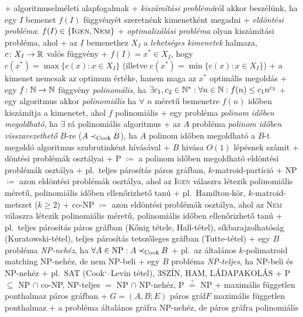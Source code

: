 + algoritmuselméleti alapfogalmak
  + \dfn \emph{kiszámítási problémá}ról akkor beszélünk, ha egy $I$
    bemenet $f(I)$ függvényét szeretnénk kimenetként megadni
    + \emph{eldöntési probléma}: $f(I) \in \{\textsc{Igen},
      \textsc{Nem}\}$
  + \dfn \emph{optimalizálási probléma} olyan kiszámítási probléma, ahol
    + az $I$ bemenethez $X_I$ a \emph{lehetséges kimenetek} halmaza,
      $c\colon X_I \to \mathbb{R}$ valós függvény
    + $f(I) = x^* \in X_I$, hogy $c(x^*) = \max \{ c(x) : x \in X_I \}$
      (illetve $c(x^*) = \min \{ c(x) : x \in X_I \}$)
    + a kimenet nemcsak az optimum értéke, hanem maga az $x^*$ optimális
      megoldás
  + \dfn egy $f \colon \mathbb{N} \to \mathbb{N}$ függvény \emph{polinomális}, ha
    $\exists c_1, c_2 \in \mathbb{N}^*: \forall n \in \mathbb{N} : f(n) \le c_1
    n^{c_2}$
    + egy algoritmus akkor \emph{polinomiális} ha $\forall$ $n$ méretű
      bemenetre $f(n)$ időben kiszámítja a kimenetet, ahol $f$
      polinomiális
    + egy probléma \emph{polinom időben megoldható}, ha $\exists$ rá
      polinomiális algoritmus
  + \dfn az $A$ probléma \emph{polinom időben visszavezethető} $B$-re
    ($A \mathbin{{\prec}_{\textrm{Cook}}} B$), ha $A$ polinom időben megoldható a
    $B$-t megoldó algoritmus szubrutinként hívásával
    + $B$ hivása $O(1)$ lépésnek számit
  + \dfn döntési problémák osztályai
    + P $\coloneqq$ a polinom időben megoldható eldöntési
      problémák osztálya
      + pl.~teljes párosítás páros gráfban, $k$-matroid-partíció
    + NP $\coloneqq$ azon eldöntési problémák osztálya, ahol az
      \textsc{Igen} válaszra létezik polinomiális méretű, polinomiális
      időben ellenőrizhető tanú
      + pl.~Hamilton-kör, $k$-matroid-metszet ($k \ge 2$)
    + co-NP $\coloneqq$ azon eldöntési problémák osztálya, ahol az
      \textsc{Nem} válaszra létezik polinomiális méretű, polinomiális
      időben ellenőrizhető tanú
      + pl.~teljes párosítás páros gráfban (Kőnig tétele, Hall-tétel),
        síkbarajzolhatóság (Kuratowski-tétel), teljes párosítás
        tetszőleges gráfban (Tutte-tétel)
    + egy $B$ probléma \emph{NP-nehéz}, ha $\forall A \in
      \mathrm{NP}: A \mathbin{{\prec}_{\textrm{Cook}}} B$
      + pl.~az általános $k$-polimatroid matching NP-nehéz, de nem
        NP-beli
    + egy $B$ probléma \emph{NP-teljes}, ha NP-beli és NP-nehéz
      + pl.~SAT (Cook`--Levin tétel), 3SZÍN, HAM, LÁDAPAKOLÁS
  + P $\subseteq$ NP $\cap$ co-NP, NP-teljes $=$ NP $\cap$ NP-nehéz, P
    $\overset{?}{=}$ NP
+ \prob maximális független ponthalmaz páros gráfban
  + \DataIn $G = (A, B; E)$ páros gráf\qquad\DataOut $F$ maximális
    független ponthalmaz
  + a probléma általános gráfra NP-nehéz, de páros gráfra polinomiális
